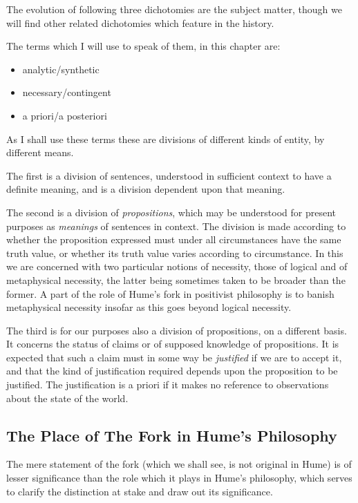 The evolution of following three dichotomies are the subject matter,
though we will find other related dichotomies which feature in the
history.

The terms which I will use to speak of them, in this chapter are:
\begin{itemize}
\item{analytic/synthetic}
\item{necessary/contingent}
\item{a priori/a posteriori}
\end{itemize}

As I shall use these terms these are divisions of different kinds of
entity, by different means.

The first is a division of sentences, understood in sufficient context
to have a definite meaning, and is a division dependent upon that
meaning.

The second is a division of \emph{propositions}, which may be
understood for present purposes as \emph{meanings} of sentences in
context.
The division is made according to whether the proposition
expressed must under all circumstances have the same truth value, or
whether its truth value varies according to circumstance.
In this we are concerned with two particular notions of necessity,
those of logical and of metaphysical necessity, the latter being
sometimes taken to be broader than the former.
A part of the role of Hume's fork in positivist philosophy is to
banish metaphysical necessity insofar as this goes beyond logical necessity.

The third is for our purposes also a division of propositions, on a
different basis.
It concerns the status of claims or of supposed knowledge of
propositions. 
It is expected that such a claim must in some way be
\emph{justified} if we are to accept it, and that the kind of
justification required depends upon the proposition to be justified.
The justification is a priori if it makes no reference to observations
about the state of the world.

\subsection{The Place of The Fork in Hume's Philosophy}

The mere statement of the fork (which we shall see, is not original in
Hume) is of lesser significance than the role which it plays in Hume's
philosophy, which serves to clarify the distinction at stake and draw
out its significance.

